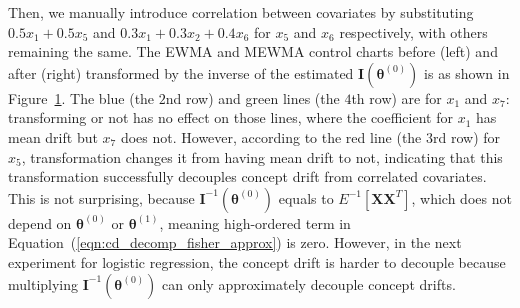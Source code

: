 \documentclass[twoside,11pt]{article}
\begin{document}
\begin{appendix}
\begin{enumerate}[(I)]
\begin{figure}[!htbp]
  \label{fig:lin_reg_not_ind_X}
\end{figure}
Then, we manually introduce correlation between {covariates} by substituting $0.5 x_1 + 0.5 x_5$ and $ 0.3 x_1 + 0.3 x_2 + 0.4 x_6$ for $x_5$ and $x_6$ respectively, with others remaining the same. The EWMA and MEWMA control charts before (left) and after (right) transformed by {the inverse of the estimated} ${\mathbf {I}}(\bm { \theta}^{(0)})$ is as shown in Figure~\ref{fig:lin_reg_not_ind_X}. The blue (the $2$nd row) and green lines (the $4$th row) are for $x_1$ and $x_7$: transforming or not has no effect on those lines, where the coefficient for $x_1$ has mean {drift} but $x_7$ does not. However, according to the red line (the $3$rd row) for $x_5$, transformation changes it from having mean {drift} to not, indicating that this transformation successfully decouples concept drift from correlated covariates. This is not surprising, because ${\mathbf {I}} ^{-1}(\bm { \theta}^{(0)})$ equals to $E ^{-1} [\bm {X}\bm {X}^T]$, which does not depend on $ \bm { \theta} ^{(0)}$ or $ \bm { \theta} ^{(1)}$, meaning high-ordered term in Equation~(\ref{eqn:cd_decomp_fisher_approx}) is zero. However, in the next experiment for logistic regression, the concept drift is harder to decouple because multiplying ${\mathbf {I}} ^{-1}(\bm { \theta}^{(0)})$ can only approximately decouple concept drifts.


\end{enumerate}
\end{appendix}
\end{document}
